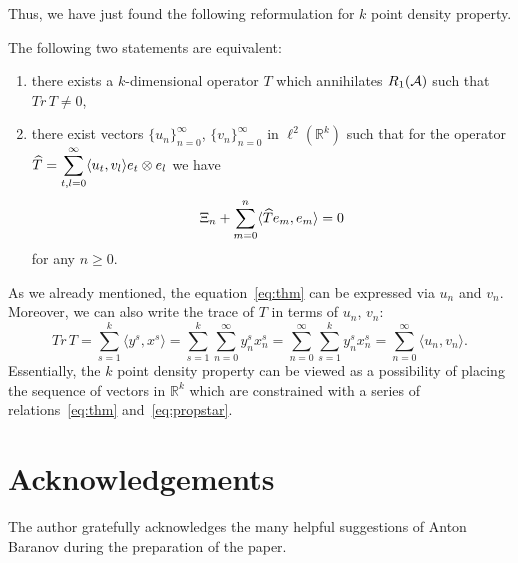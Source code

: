 \documentclass[12pt]{amsart}
\theoremstyle{case}
\begin{document}
  Thus, we have just found the following reformulation for $k$ point density property.
  \begin{prop}
    \label{prop:kreformulation}
    The following two statements are equivalent:
    \begin{enumerate}
      \item there exists a $k$-dimensional operator $T$ which annihilates $R_1(\cal{A})$
        such that $Tr\, T \neq 0$,
      \item there exist vectors $\{u_n\}_{n=0}^\infty$, $\{v_n\}_{n=0}^\infty$ in $\ell^2(\mathbb{R}^k)$ such that
        for the operator $\widehat{T} = \displaystyle\sum_{t,l=0}^\infty \inner{u_t}{v_l} e_t \otimes e_l$ we have
        \begin{equation}
          \label{eq:thm}
          \Xi_n + \sum_{m=0}^n \inner{\widehat{T}e_m}{e_m} = 0
        \end{equation}
          for any $n \geq 0$.
    \end{enumerate}
  \end{prop}
  As we already mentioned, the equation~\eqref{eq:thm} can be expressed via $u_n$ and $v_n$.
  Moreover, we can also write the trace of $T$ in terms of $u_n$, $v_n$:
    \begin{equation}
      \label{eq:propstar}
        Tr\,T = \sum_{s=1}^k \langle y^s, x^s \rangle = \sum_{s=1}^k \sum_{n=0}^\infty y^s_n x^s_n
              = \sum_{n=0}^\infty \sum_{s=1}^k y^s_n x^s_n = \sum_{n=0}^\infty \langle u_n, v_n \rangle.
    \end{equation}
  Essentially, the $k$ point density property can be viewed as a
    possibility of placing the sequence of vectors in $\mathbb{R}^k$ which are constrained with
    a series of relations~\eqref{eq:thm} and~\eqref{eq:propstar}.


\bigskip

\section{Acknowledgements}
  The author gratefully acknowledges the many helpful suggestions of Anton Baranov during the preparation of the paper.


\end{document}
